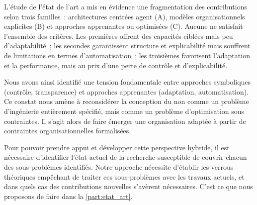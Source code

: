 L'étude de l'état de l'art a mis en évidence une fragmentation des contributions selon trois familles~: architectures centrées agent (A), modèles organisationnels explicites (B) et approches apprenantes ou optimisées (C). Aucune ne satisfait l'ensemble des critères. Les premières offrent des capacités ciblées mais peu d'adaptabilité~; les secondes garantissent structure et explicabilité mais souffrent de limitations en termes d'automatisation~; les troisièmes favorisent l'adaptation et la performance, mais au prix d'une perte de contrôle et d'explicabilité.

Nous avons ainsi identifié une tension fondamentale entre approches symboliques (contrôle, transparence) et approches apprenantes (adaptation, automatisation). Ce constat nous amène à reconsidérer la conception du  non comme un problème d'ingénierie entièrement spécifié, mais comme un problème d'optimisation sous contraintes. Il s'agit alors de faire émerger une organisation adaptée à partir de contraintes organisationnelles formalisées.

Pour pouvoir prendre appui et développer cette perspective hybride, il est nécessaire d'identifier l'état actuel de la recherche susceptible de couvrir chacun des sous-problèmes identifiés. Notre approche nécessite d'établir les verrous théoriques empêchant de traiter ces sous-problèmes avec les travaux actuels, et dans quels cas des contributions nouvelles s'avèrent nécessaires. C'est ce que nous proposons de faire dans la \autoref{part:etat_art}.